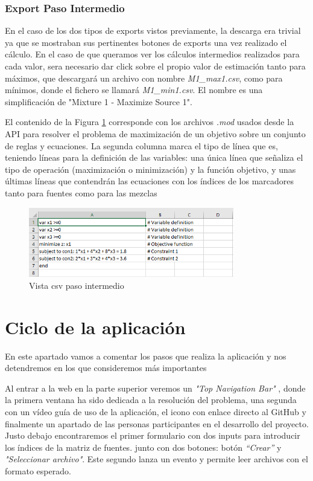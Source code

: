 \subsubsection{Export Paso Intermedio }

En el caso de los dos tipos de exports vistos previamente, la descarga era trivial  ya que se mostraban sus pertinentes botones de exports una vez realizado el cálculo. En el caso de que queramos ver los cálculos intermedios realizados para cada valor, sera necesario dar click sobre el propio valor de estimación tanto para máximos, que descargará un archivo con nombre \textit{M1\_max1.csv}, como para mínimos, donde el fichero se llamará \textit{M1\_min1.csv}. El nombre es una simplificación de "Mixture 1 - Maximize Source 1".

El contenido de la Figura \ref{fig:pasoIntermedio} corresponde con los archivos \textit{.mod} usados desde la API para resolver el problema de maximización de un objetivo sobre un conjunto de reglas y ecuaciones. La segunda columna  marca el tipo de línea que es, teniendo líneas para la definición de las variables: una  única línea que señaliza el tipo de operación (maximización o minimización) y la función objetivo, y unas últimas líneas que contendrán las ecuaciones con los índices de los marcadores tanto para fuentes como para las mezclas

\begin{figure}[h!] 
\centering
    \includegraphics[width=0.8\textwidth]{img/pasoIntermedio.PNG}
\caption{Vista csv paso intermedio}
\label{fig:pasoIntermedio}
\end{figure}

\newpage
\section{Ciclo de la aplicación}

En este apartado vamos a comentar los pasos que realiza la aplicación y nos detendremos en los que consideremos más importantes

Al entrar a la web en la parte superior veremos un \textit{"Top Navigation Bar"} \cite{Navigation:Bar}, donde la primera ventana ha sido dedicada a la resolución del problema, una segunda con un vídeo guía de uso de la aplicación, el icono con enlace directo al GitHub y finalmente un apartado de las personas participantes en el desarrollo del proyecto.
Justo debajo encontraremos el primer formulario con dos inputs para introducir los índices de la matriz de fuentes. junto con dos botones:  botón \textit{``Crear''} y  \textit{"Seleccionar archivo"}. Este segundo lanza un evento y permite leer archivos con el formato esperado.

